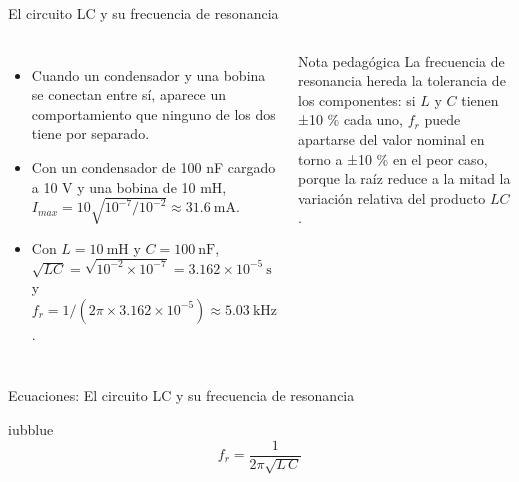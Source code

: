\documentclass[aspectratio=169,11pt,xcolor={table}]{beamer}
\begin{document}
\begin{frame}{El circuito LC y su frecuencia de resonancia}
\begin{columns}[c,onlytextwidth]
\small
\begin{itemize}\setlength{\itemsep}{4pt}
  \item Cuando un condensador y una bobina se conectan entre sí, aparece un comportamiento que ninguno de los dos tiene por separado.
  \item Con un condensador de 100 nF cargado a 10 V y una bobina de 10 mH, $I_{max} = 10\sqrt{10^{-7}/10^{-2}} \approx 31.6\ \text{mA}$.
  \item Con $L = 10\ \text{mH}$ y $C = 100\ \text{nF}$, $\sqrt{LC} = \sqrt{10^{-2} \times 10^{-7}} = 3.162 \times 10^{-5}\ \text{s}$ y $f_r = 1/(2\pi \times 3.162 \times 10^{-5}) \approx 5.03\ \text{kHz}$.
\end{itemize}
\begin{cardO}{Nota pedagógica}
\footnotesize La frecuencia de resonancia hereda la tolerancia de los componentes: si $L$ y $C$ tienen ±10 \% cada uno, $f_r$ puede apartarse del valor nominal en torno a ±10 \% en el peor caso, porque la raíz reduce a la mitad la variación relativa del producto $LC$.
\end{cardO}
\end{columns}
\end{frame}

\begin{frame}{{\normalsize Ecuaciones: El circuito LC y su frecuencia de resonancia}}
\begin{cajaplana}{iubblue}
\centering
{\large
\begin{equation*}
  f_r = \frac{1}{2\pi\sqrt{L\,C}}
\end{equation*}
}
\end{cajaplana}
\end{frame}
\end{document}
